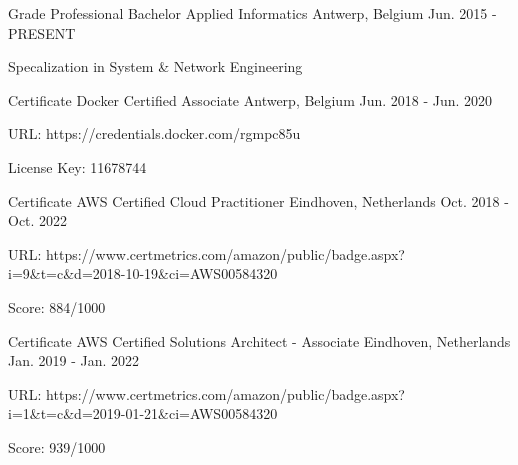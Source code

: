 

\begin{cventries}

  \cventry
    {Grade} %
    {Professional Bachelor Applied Informatics} %
    {Antwerp, Belgium} %
    {Jun. 2015 - PRESENT} %
    {
      \begin{cvitems} %
        \item {Specalization in System \& Network Engineering}
      \end{cvitems}
    }

  \cventry
    {Certificate} %
    {Docker Certified Associate} %
    {Antwerp, Belgium} %
    {Jun. 2018 - Jun. 2020} %
    {
      \begin{cvitems} %
        \item {URL: https://credentials.docker.com/rgmpc85u}
        \item {License Key: 11678744}
      \end{cvitems}
    }

  \cventry
    {Certificate} %
    {AWS Certified Cloud Practitioner} %
    {Eindhoven, Netherlands} %
    {Oct. 2018 - Oct. 2022} %
    {
      \begin{cvitems} %
        \item {URL: https://www.certmetrics.com/amazon/public/badge.aspx?i=9\&t=c\&d=2018-10-19\&ci=AWS00584320}
        \item {Score: 884/1000}
      \end{cvitems}
    }

  \cventry
    {Certificate} %
    {AWS Certified Solutions Architect - Associate} %
    {Eindhoven, Netherlands} %
    {Jan. 2019 - Jan. 2022} %
    {
      \begin{cvitems} %
        \item {URL: https://www.certmetrics.com/amazon/public/badge.aspx?i=1\&t=c\&d=2019-01-21\&ci=AWS00584320}
        \item {Score: 939/1000}
      \end{cvitems}
    }


\end{cventries}
